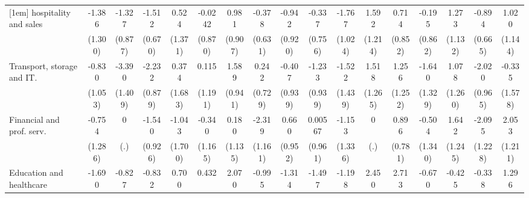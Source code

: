 {\begin{tabular}{l*{16}{c}}
[1em]
hospitality and sales&      -1.386         &      -1.327         &      -1.512\sym{*}  &       0.524         &     -0.0242         &       0.981         &      -0.378         &      -0.942         &      -0.337         &      -1.767         &       1.592         &       0.714         &      -0.195         &       1.273         &      -0.894         &       1.020         \\
                    &     (1.300)         &     (0.877)         &     (0.670)         &     (1.371)         &     (0.870)         &     (0.907)         &     (0.631)         &     (0.920)         &     (0.756)         &     (1.024)         &     (1.214)         &     (0.852)         &     (0.862)         &     (1.132)         &     (0.665)         &     (1.144)         \\
[1em]
Transport, storage and IT.&      -0.830         &      -3.390\sym{*}  &      -2.232\sym{*}  &       0.374         &       0.115         &       1.589         &       0.242         &      -0.407         &      -1.233         &      -1.522         &       1.518         &       1.256         &      -1.640         &       1.078         &      -2.020\sym{*}  &      -0.335         \\
                    &     (1.053)         &     (1.409)         &     (0.879)         &     (1.683)         &     (1.191)         &     (0.941)         &     (0.729)         &     (0.939)         &     (0.939)         &     (1.439)         &     (1.265)         &     (1.252)         &     (1.329)         &     (1.260)         &     (0.965)         &     (1.578)         \\
[1em]
Financial and prof. serv.&      -0.754         &           0         &      -1.540         &      -1.043         &      -0.340         &       0.180         &      -2.319\sym{*}  &       0.660         &     0.00567         &      -1.153         &           0         &       0.896         &      -0.504         &       1.642         &      -2.095         &       2.053         \\
                    &     (1.286)         &         (.)         &     (0.926)         &     (1.700)         &     (1.165)         &     (1.135)         &     (1.161)         &     (0.952)         &     (0.961)         &     (1.336)         &         (.)         &     (0.781)         &     (1.340)         &     (1.245)         &     (1.228)         &     (1.211)         \\
[1em]
Education and healthcare&      -1.690         &      -0.827         &      -0.832         &       0.700         &       0.432         &       2.070\sym{*}  &      -0.995         &      -1.314         &      -1.497         &      -1.198         &       2.450         &       2.713\sym{*}  &      -0.670         &      -0.425         &      -0.338         &       1.296         \\

\end{tabular}}
